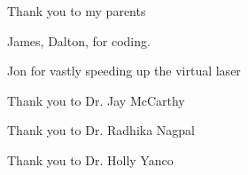 Thank you to my parents

James, Dalton, for coding. 

Jon for vastly speeding up the virtual laser

Thank you to Dr. Jay McCarthy

Thank you to Dr. Radhika Nagpal

Thank you to Dr. Holly Yanco

